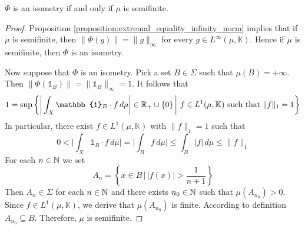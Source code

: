 \begin{theorem}\label{theorem:dual_to_L_1_isometry}
  $\Phi$ is an isometry if and only if $\mu$ is semifinite.
\end{theorem}
\begin{proof}
  Proposition \ref{proposition:extremal_equality_infinity_norm} implies that if $\mu$ is semifinite, then $\lVert \Phi(g) \rVert = \lVert g \rVert_{\infty}$ for every $g \in L^{\infty}(\mu,\mathbb{K})$. Hence if $\mu$ is semifinite, then $\Phi$ is an isometry.
  
  Now suppose that $\Phi$ is an isometry. Pick a set $B \in \Sigma$ such that $\mu(B) = +\infty$. Then $\lVert \Phi(\mathbb{1}_B) \rVert = \lVert \mathbb{1}_B \rVert_{\infty} = 1$. It follows that
  $$1 = \sup \bigg\{\bigg|\int_X\mathbb{1}_B \cdot f\,d\mu\bigg|\in \RR_+\cup \{0\}\,\bigg|\,\,f \in L^1(\mu,\mathbb{K})\mbox{ such that }\lVert f\rVert_1 = 1\bigg\}$$
  In particular, there exist $f \in L^1(\mu,\mathbb{K})$ with $\lVert f \rVert_1 = 1$ such that
  $$0 < \bigg|\int_X\mathbb{1}_B \cdot f\,d\mu\bigg| = \bigg|\int_B f\,d\mu\bigg| \leq \int_B |f|\,d\mu \leq \lVert f \rVert_1$$
  For each $n\in {\mathbb N}$ we set
  $$A_n = \left\{x\in B\,\bigg|\,|f(x)| > \frac{1}{n + 1}\right\}$$
  Then $A_n \in \Sigma$ for each $n\in {\mathbb N}$ and there exists $n_0 \in {\mathbb N}$ such that $\mu(A_{n_0}) > 0$. Since $f \in L^1(\mu,\mathbb{K})$, we derive that $\mu(A_{n_0})$ is finite. According to definition $A_{n_0}\subseteq B$. Therefore, $\mu$ is semifinite. 
\end{proof}
  
